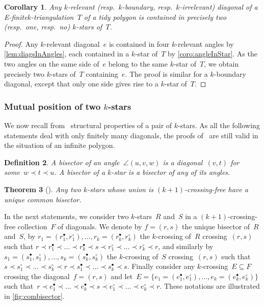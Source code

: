 \documentclass{amsart}
\newtheorem{theorem}{Theorem}[section]
\newtheorem{corollary}[theorem]{Corollary}
\newtheorem{definition}[theorem]{Definition}
\theoremstyle{remark}
\newcommand{\darkblue}{\color{darkblue}} %
\newcommand{\defn}[1]{\textsl{\darkblue #1}} %
\newcommand*{\ef}[0]{E-finite\xspace}
\newcommand{\cl}{\prec}
\begin{document}
\begin{corollary}
\label{coro:edgeInStars}
Any $k$-relevant (resp.~$k$-boundary, resp.~$k$-irrelevant) diagonal of a \ef $k$-triangulation~$T$ of a tidy polygon is contained in precisely two (resp.~one, resp.~no) $k$-stars of~$T$.
\end{corollary}

\begin{proof}
Any $k$-relevant diagonal~$e$ is contained in four $k$-relevant angles by \cref{lem:diagsInAngles}, each contained in a $k$-star of~$T$ by \cref{coro:angleInStar}.
As the two angles on the same side of~$e$ belong to the same $k$-star of~$T$, we obtain precisely two $k$-stars of~$T$ containing~$e$.
The proof is similar for a $k$-boundary diagonal, except that only one side gives rise to a $k$-star of~$T$.
\end{proof}


\subsubsection{Mutual position of two $k$-stars}

We now recall from~\cite[Sect.~3]{PilaudSantos-multitriangulations} structural properties of a pair of $k$-stars.
As all the following statements deal with only finitely many diagonals, the proofs of~\cite{PilaudSantos-multitriangulations} are still valid in the situation of an infinite polygon.

\begin{definition}
A \defn{bisector} of an angle~$\angle(u,v,w)$ is a diagonal~$(v,t)$ for some~$w \cl t \cl u$.
A \defn{bisector} of a $k$-star is a bisector of any of its angles.
\end{definition}

\begin{theorem}[{\cite[Thm.~3.5]{PilaudSantos-multitriangulations}}]
\label{thm:uniqueCommonBisector}
Any two $k$-stars whose union is $(k+1)$-crossing-free have a unique common bisector.
\end{theorem}

In the next statements, we consider two $k$-stars~$R$ and~$S$ in a $(k+1)$-crossing-free collection~$F$ of diagonals.
We denote by $f = (r,s)$ the unique bisector of~$R$ and~$S$, by ${r_1 = (r^\bullet_1, r^\circ_1), \dots, r_k = (r^\bullet_k, r^\circ_k)}$ the $k$-crossing of~$R$ crossing~$(r,s)$ such that ${r \cl r^\bullet_1 \cl \dots \cl r^\bullet_k \cl s \cl r^\circ_1 \cl \dots \cl r^\circ_k \cl r}$, and similarly by~$s_1 = (s^\bullet_1, s^\circ_1), \dots, s_k = (s^\bullet_k, s^\circ_k)$ the $k$-crossing of~$S$ crossing~$(r,s)$ such that~$s \cl s^\circ_1 \cl \dots \cl s^\circ_k \cl r \cl s^\bullet_1 \cl \dots \cl s^\bullet_k \cl s$.
Finally consider any $k$-crossing~$E \subseteq F$ crossing the diagonal~$f = (r,s)$ and let~$E = \{e_1 = (e^\bullet_1, e^\circ_1), \dots, e_k = (e^\bullet_k, e^\circ_k)\}$ such that~${r \cl e^\bullet_1 \cl \dots \cl e^\bullet_k \cl s \cl e^\circ_1 \cl \dots \cl e^\circ_k \cl r}$.
These notations are illustrated in \cref{fig:combisector}.
\end{document}
